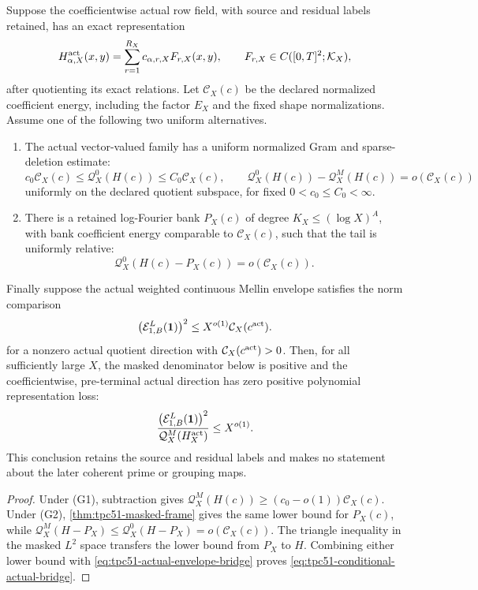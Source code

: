\begin{proposition}
\label{prop:tpc51-actual-bridge-criterion}
Suppose the coefficientwise actual row field, with source and residual
labels retained, has an exact representation
\[
 H_{\alpha,X}^{\rm act}(x,y)
 =\sum_{r=1}^{R_X}c_{\alpha,r,X}F_{r,X}(x,y),
 \qquad F_{r,X}\in C([0,T]^2;\mathcal K_X),
\]
after quotienting its exact relations.  Let \(\mathcal C_X(c)\) be the
declared normalized coefficient energy, including the factor \(E_X\)
and the fixed shape normalizations.  Assume one of the following two
uniform alternatives.
\begin{enumerate}[label=\textup{(G\arabic*)},leftmargin=3.2em]
 \item The actual vector-valued family has a uniform normalized Gram and
 sparse-deletion estimate:
 \[
  c_0\mathcal C_X(c)\leq\mathcal Q_X^0(H(c))
  \leq C_0\mathcal C_X(c),
  \qquad
  \mathcal Q_X^0(H(c))-\mathcal Q_X^M(H(c))
  =o(\mathcal C_X(c))
 \]
 uniformly on the declared quotient subspace, for fixed
 \(0<c_0\leq C_0<\infty\).
 \item There is a retained log-Fourier bank \(P_X(c)\) of degree
 \(K_X\leq(\log X)^A\), with bank coefficient energy comparable to
 \(\mathcal C_X(c)\), such that the tail is uniformly relative:
 \[
  \mathcal Q_X^0(H(c)-P_X(c))=o(\mathcal C_X(c)).
 \]
\end{enumerate}
Finally suppose the actual weighted continuous Mellin envelope satisfies
the norm comparison
\begin{equation}
 \bigl(\mathcal E_{1,B}^L(\mathbf 1)\bigr)^2
 \leq X^{o(1)}\mathcal C_X(c^{\rm act}).
 \label{eq:tpc51-actual-envelope-bridge}
\end{equation}
for a nonzero actual quotient direction with
$\mathcal C_X(c^{\rm act})>0$.  Then, for all sufficiently large $X$, the
masked denominator below is positive and the coefficientwise,
pre-terminal actual direction has zero positive polynomial
representation loss:
\begin{equation}
 \frac{\bigl(\mathcal E_{1,B}^L(\mathbf 1)\bigr)^2}
 {\mathcal Q_X^M(H_X^{\rm act})}
 \leq X^{o(1)}.
 \label{eq:tpc51-conditional-actual-bridge}
\end{equation}
This conclusion retains the source and residual labels and makes no
statement about the later coherent prime or grouping maps.
\end{proposition}

\begin{proof}
Under \textup{(G1)}, subtraction gives
\(\mathcal Q_X^M(H(c))\geq(c_0-o(1))\mathcal C_X(c)\).
Under \textup{(G2)}, \cref{thm:tpc51-masked-frame} gives the same lower
bound for \(P_X(c)\), while
\(\mathcal Q_X^M(H-P_X)\leq\mathcal Q_X^0(H-P_X)=o(\mathcal C_X(c))\).
The triangle inequality in the masked \(L^2\) space transfers the lower
bound from \(P_X\) to \(H\).  Combining either lower bound with
\eqref{eq:tpc51-actual-envelope-bridge} proves
\eqref{eq:tpc51-conditional-actual-bridge}.
\end{proof}

